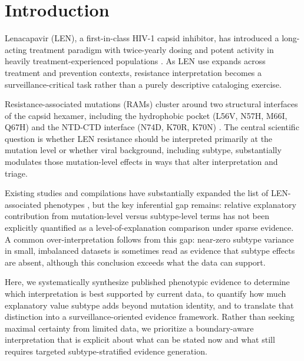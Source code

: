 \documentclass[preprint,authoryear]{elsarticle}
\begin{document}
\linenumbers

\section{Introduction}

Lenacapavir (LEN), a first-in-class HIV-1 capsid inhibitor, has introduced a long-acting treatment paradigm with twice-yearly dosing and potent activity in heavily treatment-experienced populations \cite{Link2020,Segal2022}. As LEN use expands across treatment and prevention contexts, resistance interpretation becomes a surveillance-critical task rather than a purely descriptive cataloging exercise.

Resistance-associated mutations (RAMs) cluster around two structural interfaces of the capsid hexamer, including the hydrophobic pocket (L56V, N57H, M66I, Q67H) and the NTD-CTD interface (N74D, K70R, K70N) \cite{Bester2022,Margot2025}. The central scientific question is whether LEN resistance should be interpreted primarily at the mutation level or whether viral background, including subtype, substantially modulates those mutation-level effects in ways that alter interpretation and triage.

Existing studies and compilations have substantially expanded the list of LEN-associated phenotypes \cite{Hansen2025}, but the key inferential gap remains: relative explanatory contribution from mutation-level versus subtype-level terms has not been explicitly quantified as a level-of-explanation comparison under sparse evidence. A common over-interpretation follows from this gap: near-zero subtype variance in small, imbalanced datasets is sometimes read as evidence that subtype effects are absent, although this conclusion exceeds what the data can support.

Here, we systematically synthesize published phenotypic evidence to determine which interpretation is best supported by current data, to quantify how much explanatory value subtype adds beyond mutation identity, and to translate that distinction into a surveillance-oriented evidence framework. Rather than seeking maximal certainty from limited data, we prioritize a boundary-aware interpretation that is explicit about what can be stated now and what still requires targeted subtype-stratified evidence generation.

\end{document}
